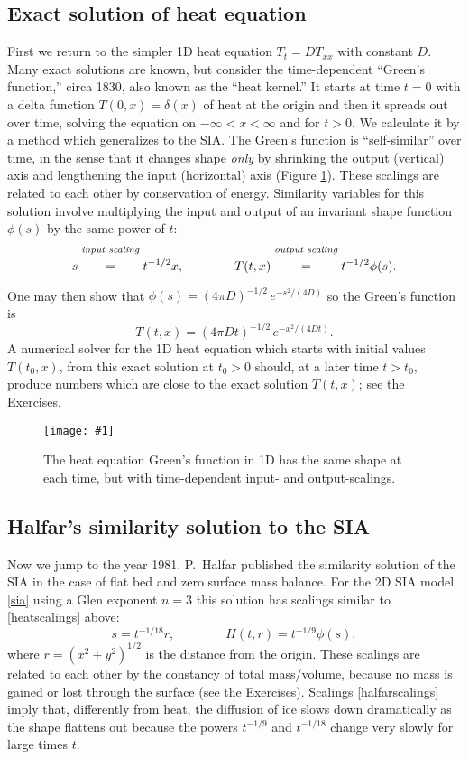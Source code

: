 \documentclass[letterpaper,final,12pt,reqno]{amsart}
\newcommand{\onefigsize}[3]{
\begin{figure}[ht]
\centering
\texttt{[image: \#1]}
\caption{#2}
\label{fig:#1}
\end{figure}}
\begin{document}
\subsection*{Exact solution of heat equation}  First we return to the simpler 1D heat equation $T_t = D T_{xx}$ with constant $D$.  Many exact solutions are known, but consider the time-dependent ``Green's function,'' circa 1830, also known as the ``heat kernel.''  It starts at time $t=0$ with a delta function $T(0,x)=\delta(x)$ of heat at the origin and then it spreads out over time, solving the equation on $-\infty<x<\infty$ and for $t>0$.  We calculate it by a method which generalizes to the SIA.  The Green's function is ``self-similar'' over time, in the sense that it changes shape \emph{only} by shrinking the output (vertical) axis and lengthening the input (horizontal) axis (Figure \ref{fig:heatscaling}).  These scalings are related to each other by conservation of energy.  Similarity variables for this solution involve multiplying the input and output of an invariant shape function $\phi(s)$ by the same power of $t$:
\begin{equation}
s \stackrel{\text{\emph{input scaling}}}{\phantom{\Big|}=\phantom{\Big|}} t^{-1/2} x, \qquad\qquad T(t,x) \stackrel{\text{\emph{output scaling}}}{\phantom{\Big|}=\phantom{\Big|}} t^{-1/2} \phi(s).  \label{heatscalings}
\end{equation}
One may then show that $\phi(s) = (4 \pi D)^{-1/2}\, e^{-s^2/(4D)}$ so the Green's function is
  $$T(t,x) = (4 \pi D t)^{-1/2}\, e^{-x^2/(4Dt)}.$$
A numerical solver for the 1D heat equation which starts with initial values $T(t_0,x)$, from this exact solution at $t_0>0$ should, at a later time $t>t_0$, produce numbers which are close to the exact solution $T(t,x)$; see the Exercises.

\onefigsize{heatscaling}{The heat equation Green's function in 1D has the same shape at each time, but with time-dependent input- and output-scalings.}{2.4in}

\subsection*{Halfar's similarity solution to the SIA}  Now we jump to the year 1981.  P.~Halfar \cite{Halfar81} published the similarity solution of the SIA in the case of flat bed and zero surface mass balance.  For the 2D SIA model \eqref{sia} using a Glen exponent $n=3$ this solution \cite{Halfar83} has scalings similar to \eqref{heatscalings} above:
\begin{equation}
s = t^{-1/18} r, \qquad \qquad H(t,r)=t^{-1/9} \phi(s), \label{halfarscalings}
\end{equation}
where $r=(x^2+y^2)^{1/2}$ is the distance from the origin.  These scalings are related to each other by the constancy of total mass/volume, because no mass is gained or lost through the surface (see the Exercises). Scalings \eqref{halfarscalings} imply that, differently from heat, the diffusion of ice slows down dramatically as the shape flattens out because the powers $t^{-1/9}$ and $t^{-1/18}$ change very slowly for large times $t$.
\end{document}
